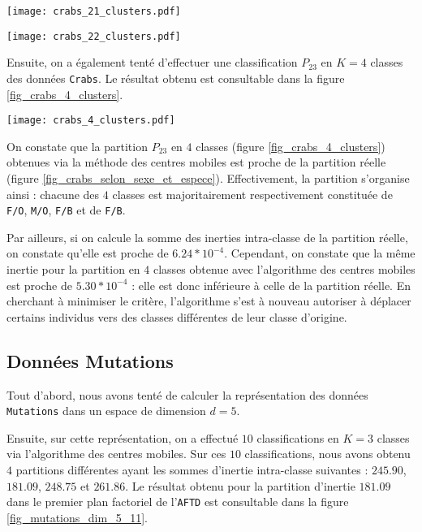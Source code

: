\documentclass{article}
\begin{document}
\begin{multicols}{2}
\begingroup
	\centering
   \begin{minipage}[c]{0.23\textwidth}
      \centering \texttt{[image: crabs\_21\_clusters.pdf]}
   \end{minipage}\hfill
   \begin{minipage}[c]{0.23\textwidth}   
      \centering \texttt{[image: crabs\_22\_clusters.pdf]}
   \end{minipage}
     \label{fig_crabs_21_22_clusters}
\endgroup


Ensuite, on a également tenté d'effectuer une classification $P_{23}$ en $K = 4$ classes des données \texttt{Crabs}. Le résultat obtenu est consultable dans la figure \ref{fig_crabs_4_clusters}.

\begingroup
   \centering
   \texttt{[image: crabs\_4\_clusters.pdf]}
    \label{fig_crabs_4_clusters}
\endgroup

On constate que la partition $P_{23}$ en $4$ classes (figure \ref{fig_crabs_4_clusters}) obtenues via la méthode des centres mobiles est proche de la partition réelle (figure \ref{fig_crabs_selon_sexe_et_espece}). Effectivement, la partition s'organise ainsi : chacune des $4$ classes est majoritairement respectivement constituée de \texttt{F/O}, \texttt{M/O}, \texttt{F/B} et de \texttt{F/B}.

Par ailleurs, si on calcule la somme des inerties intra-classe de la partition réelle, on constate qu'elle est proche de $6.24 * 10^{-4}$. Cependant, on constate que la même inertie pour la partition en $4$ classes obtenue avec l'algorithme des centres mobiles est proche de $5.30 * 10^{-4}$ : elle est donc inférieure à celle de la partition réelle. En cherchant à minimiser le critère, l'algorithme s'est à nouveau autoriser à déplacer certains individus vers des classes différentes de leur classe d'origine.

\subsection{Données Mutations}
\label{subsec_methode_centres_mobiles_mutations}
Tout d'abord, nous avons tenté de calculer la représentation des données \texttt{Mutations} dans un espace de dimension $d = 5$.

Ensuite, sur cette représentation, on a effectué $10$ classifications en $K = 3$ classes via l'algorithme des centres mobiles.  Sur ces $10$ classifications, nous avons obtenu $4$ partitions différentes ayant les sommes d'inertie intra-classe suivantes : $245.90$, $181.09$, $248.75$ et $261.86$. Le résultat obtenu pour la partition d'inertie $181.09$ dans le premier plan factoriel de l'\texttt{AFTD} est consultable dans la figure \ref{fig_mutations_dim_5_11}.


\end{multicols}
\end{document}
